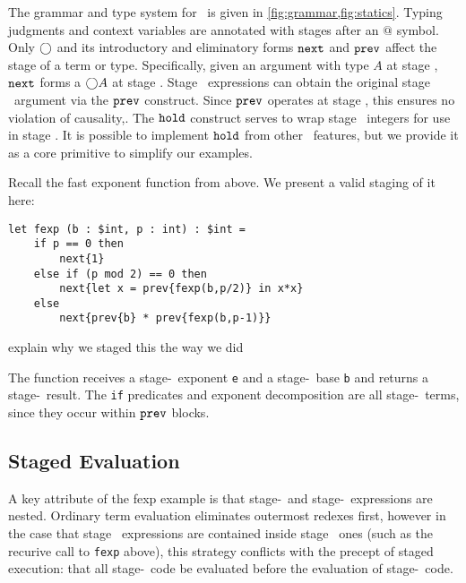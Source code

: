 The grammar and type system for \lang\ is given in \ref{fig:grammar,fig:statics}. 
Typing judgments and context variables are annotated with stages after an $@$ symbol.
Only $\bigcirc$ and its introductory and eliminatory forms ${\tt next}$ and ${\tt prev}$ affect the stage
of a term or type.
Specifically, given an argument with type $A$ at stage \bbtwo, ${\tt next}$ forms a $\bigcirc A$ at stage \bbone.  
Stage \bbtwo\ expressions can obtain the original stage \bbtwo\ argument via the ${\tt prev}$ construct.  
Since ${\tt prev}$ operates at stage \bbtwo, this ensures no violation of causality,\cite{cave14}.
The ${\tt hold}$ construct serves to wrap stage \bbone\ integers for use in stage \bbtwo.  
It is possible to implement ${\tt hold}$ from other \lang\ features, but
we provide it as a core primitive to simplify our examples. 

Recall the fast exponent function from above.
We present a valid staging of it here:
\begin{lstlisting} 
let fexp (b : $int, p : int) : $int =
	if p == 0 then
		next{1}
	else if (p mod 2) == 0 then
		next{let x = prev{fexp(b,p/2)} in x*x}
	else
		next{prev{b} * prev{fexp(b,p-1)}}		
\end{lstlisting}

\TODO explain why we staged this the way we did

The function receives a stage-\bbone\ exponent {\tt e} and a stage-\bbtwo\ base {\tt b} and returns a stage-\bbtwo\ result. 
The {\tt if} predicates and exponent decomposition are all stage-\bbone\ terms, since they occur within ${\tt prev}$ blocks.

\subsection{Staged Evaluation}
\label{sec:stagedsemantics}

A key attribute of the fexp example is that stage-\bbone\ and stage-\bbtwo\ expressions are nested. 
Ordinary term evaluation eliminates outermost redexes first, 
however in the case that stage \bbone\ expressions are contained inside stage \bbtwo\ ones 
(such as the recurive call to {\tt fexp} above), 
this strategy conflicts with the precept of staged execution: 
that all stage-\bbone\ code be evaluated before the evaluation of stage-\bbtwo\ code. 

